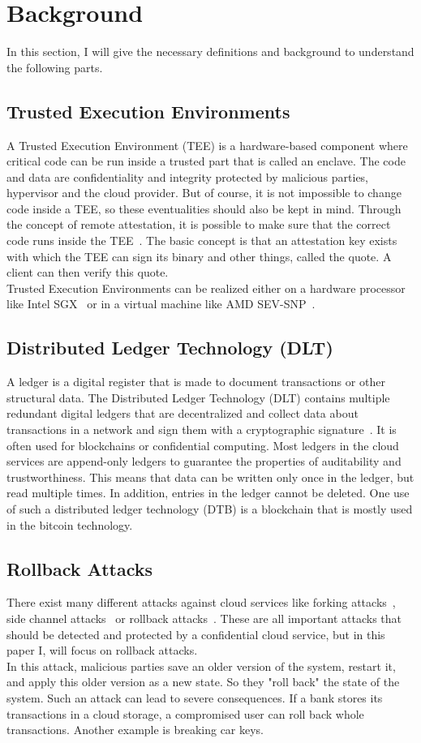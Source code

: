 \section{Background}
In this section, I will give the necessary definitions and background to understand the following parts. 
\subsection{Trusted Execution Environments}
A Trusted Execution Environment (TEE) is a hardware-based component where critical code can be run inside a trusted part that is called an enclave. The code and data are confidentiality and integrity protected by malicious parties, hypervisor and the cloud provider.  But of course, it is not impossible to change code inside a TEE, so these eventualities should also be kept in mind. Through the concept of remote attestation, it is possible to make sure that the correct code runs inside the TEE~\cite{remoteAttestation}.  The basic concept is that an attestation key exists with which the TEE can sign its binary and other things, called the quote. A client can then verify this quote. \\ %
Trusted Execution Environments can be realized either on a hardware processor like Intel SGX~\cite{sgx} or in a virtual machine like AMD SEV-SNP~\cite{amd}.%
\subsection{Distributed Ledger Technology (DLT)}
A ledger is a digital register that is made to document transactions or other structural data. The Distributed Ledger Technology (DLT) contains multiple redundant digital ledgers that are decentralized and collect data about transactions in a network and sign them with a cryptographic signature~\cite{ledger}. It is often used for blockchains or confidential computing. Most ledgers in the cloud services are append-only ledgers to guarantee the properties of auditability and trustworthiness. This means that data can be written only once in the ledger, but read multiple times. In addition, entries in the ledger cannot be deleted. One use of such a distributed ledger technology (DTB) is a blockchain that is mostly used in the bitcoin technology.
\subsection{Rollback Attacks}
There exist many different attacks against cloud services like forking attacks~\cite{forkingAttacks}, side channel attacks~\cite{sideChannel} or rollback attacks~\cite{Rollback}. These are all important attacks that should be detected and protected by a confidential cloud service, but in this paper I, will focus on rollback attacks.\\
In this attack, malicious parties save an older version of the system, restart it, and apply this older version as a new state. So they "roll back" the state of the system. Such an attack can lead to severe consequences. If a bank stores its transactions in a cloud storage, a compromised user can roll back whole transactions. Another example is breaking car keys. %